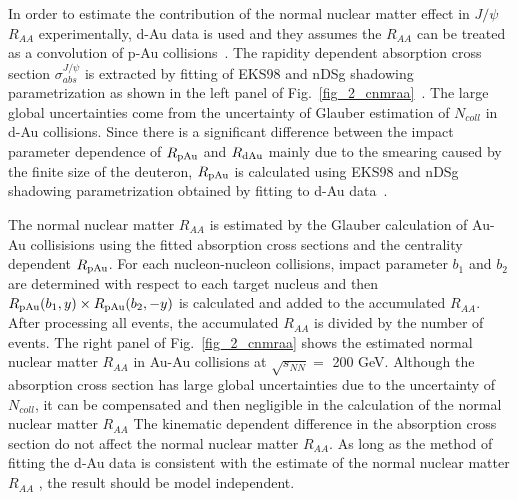 In order to estimate the contribution of the normal nuclear matter effect in $J/\psi$ $R_{AA}$ experimentally, d-Au data is used and they assumes the $R_{AA}$ can be treated as a convolution of p-Au collisions~\cite{bib_daucorr,bib_daucorr2}. 
The rapidity dependent absorption cross section $\sigma^{J/\psi}_{abs}$ is extracted by fitting of EKS98 and nDSg shadowing parametrization as shown in the left panel of Fig.~\ref{fig_2_cnmraa}~\cite{bib_daucorr2}. 
The large global uncertainties come from the uncertainty of Glauber estimation of $N_{coll}$ in d-Au collisions. 
Since there is a significant difference between the impact parameter dependence of $R_{\rm{pAu}}$ and $R_{\rm{dAu}}$ mainly due to the smearing caused by the finite size of the deuteron, $R_{\rm{pAu}}$ is calculated using EKS98 and nDSg shadowing parametrization obtained by fitting to d-Au data~\cite{bib_shadowmodel}. 

The normal nuclear matter $R_{AA}$ is estimated by the Glauber calculation of Au-Au collisisions using the fitted absorption cross sections and the centrality dependent $R_{\rm{pAu}}$. 
For each nucleon-nucleon collisions, impact parameter $b_{1}$ and $b_{2}$ are determined with respect to each target nucleus and then $R_{\rm{pAu}}(b_{1}, y) \times R_{\rm{pAu}}(b_{2}, -y)$ is calculated and added to the accumulated $R_{AA}$. 
After processing all events, the accumulated $R_{AA}$ is divided by the number of events. 
The right panel of Fig.~\ref{fig_2_cnmraa} shows the estimated normal nuclear matter $R_{AA}$ in Au-Au collisions at $\sqrt{s_{NN}} =$ 200 GeV.
Although the absorption cross section has large global uncertainties due to the uncertainty of $N_{coll}$, it can be compensated and then negligible in the calculation of the normal nuclear matter $R_{AA}$  
The kinematic dependent difference in the absorption cross section do not affect the normal nuclear matter $R_{AA}$. 
As long as the method of fitting the d-Au data is consistent with the estimate of the normal nuclear matter $R_{AA}$ , the result should  be model independent. 


